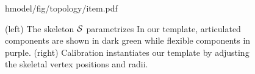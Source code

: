\begin{figure}[t!]
\centering
\begin{overpic} 
[width=\linewidth]
{hmodel/fig/topology/item.pdf}
\end{overpic}
\caption{
% 
% 
(left) The skeleton $\mathcal{S}$ parametrizes  
% 
In our template, articulated components are shown in {\color{darkgreen} dark green} while flexible components in {\color{purple}purple}.
% 
(right) Calibration instantiates our template by adjusting the skeletal vertex positions and radii. 
% 
% 
}
\label{fig:topology}
\end{figure}